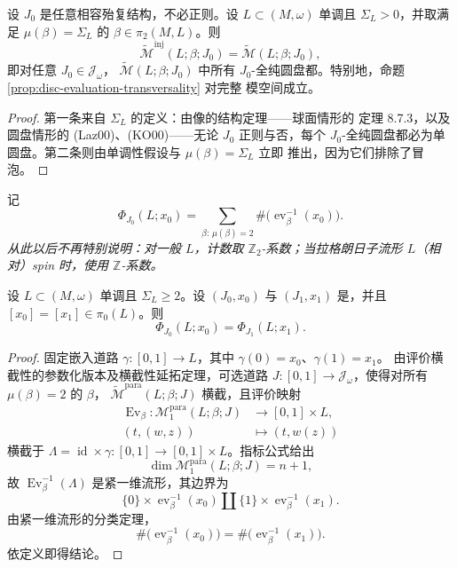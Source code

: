 \begin{lemma}
\label{lem:minimal-maslov-discs-somewhere-injective}
设 $J_0$ 是任意相容殆复结构，不必正则。设 $L\subset(M,\omega)$ 单调且
$\Sigma_L>0$，并取满足 $\mu(\beta)=\Sigma_L$ 的
$\beta\in\pi_2(M,L)$。则
\[
 \widetilde{\mathcal M}^{\mathrm{inj}}(L;\beta;J_0)
 =\widetilde{\mathcal M}(L;\beta;J_0),
\]
即对任意 $J_0\in\mathcal J_\omega$，
$\widetilde{\mathcal M}(L;\beta;J_0)$ 中所有 $J_0$-全纯圆盘都\termSomewhereInjective{}。特别地，命题\ref{prop:disc-evaluation-transversality} 对完整
模空间成立。
\end{lemma}

\begin{proof}
第一条来自\termMinimalMaslovNumber{} $\Sigma_L$ 的定义：由像的结构定理——球面情形的
定理 8.7.3，以及圆盘情形的 (Laz00)、(KO00)——无论 $J_0$ 正则与否，每个
$J_0$-全纯圆盘都必为单圆盘。第二条则由单调性假设与 $\mu(\beta)=\Sigma_L$ 立即
推出，因为它们排除了冒泡。
\end{proof}

记
\[
 \Phi_{J_0}(L;x_0)
 =\sum_{\beta:\,\mu(\beta)=2}\#\bigl(\operatorname{ev}_\beta^{-1}(x_0)\bigr).
\]
\emph{从此以后不再特别说明：对一般 $L$，计数取 $\mathbb Z_2$-系数；当拉格朗日子流形
$L$（相对）spin 时，使用 $\mathbb Z$-系数。}

\begin{lemma}
\label{lem:one-point-count-invariance}
设 $L\subset(M,\omega)$ 单调且 $\Sigma_L\geq2$。设 $(J_0,x_0)$ 与
$(J_1,x_1)$ 是\termTransversePair{}，并且 $[x_0]=[x_1]\in\pi_0(L)$。则
\[
 \Phi_{J_0}(L;x_0)=\Phi_{J_1}(L;x_1).
\]
\end{lemma}

\begin{proof}
固定嵌入道路 $\gamma:[0,1]\to L$，其中 $\gamma(0)=x_0$、$\gamma(1)=x_1$。
由评价横截性的参数化版本及横截性延拓定理，可选道路
$J:[0,1]\to\mathcal J_\omega$，使得对所有 $\mu(\beta)=2$ 的 $\beta$，
$\widetilde{\mathcal M}^{\mathrm{para}}(L;\beta;J)$ 横截，且评价映射
\[
 \begin{aligned}
 \operatorname{Ev}_\beta:
 \mathcal M_1^{\mathrm{para}}(L;\beta;J)&\longrightarrow[0,1]\times L,\\
 (t,(w,z))&\longmapsto(t,w(z))
 \end{aligned}
\]
横截于 $\Lambda=\operatorname{id}\times\gamma:[0,1]\to[0,1]\times L$。指标公式给出
\[
 \dim\mathcal M_1^{\mathrm{para}}(L;\beta;J)=n+1,
\]
故 $\operatorname{Ev}_\beta^{-1}(\Lambda)$ 是紧一维流形，其边界为
\[
 \{0\}\times\operatorname{ev}_\beta^{-1}(x_0)
 \coprod
 \{1\}\times\operatorname{ev}_\beta^{-1}(x_1).
\]
由紧一维流形的分类定理，
\[
 \#\bigl(\operatorname{ev}_\beta^{-1}(x_0)\bigr)
 =\#\bigl(\operatorname{ev}_\beta^{-1}(x_1)\bigr).
\]
依定义即得结论。
\end{proof}

